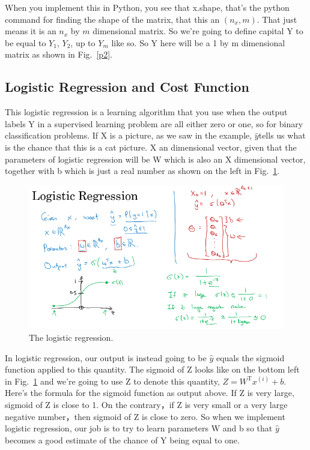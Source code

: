 \documentclass[a4paper]{article}
\begin{document}
When you implement this in Python, you see that x.shape, that's the python command for finding the shape of the matrix, that this an $(n_x, m)$. That just means it is an $n_x$ by $m$ dimensional matrix. So we're going to define capital Y to be equal to $Y_1$, $Y_2$, up to $Y_m$ like so. So Y here will be a 1 by m dimensional matrix as shown in Fig.~\ref{p2}.

\subsection{Logistic Regression and Cost Function}

This logistic regression is a learning algorithm that you use when the output labels Y in a supervised learning problem are all either zero or one, so for binary classification problems. If X is a picture, as we saw in the example, $\hat{y}$tells us what is the chance that this is a cat picture. X an dimensional vector, given that the parameters of logistic regression will be W which is also an X dimensional vector, together with b which is just a real number as shown on the left in Fig.~\ref{p3}.
\begin{figure}
	\begin{center}
		\includegraphics[scale=0.4]{figures/4.png}
	\end{center}
	\caption{The logistic regression.}
	\label{p3}
\end{figure}

In logistic regression, our output is instead going to be $\hat{y}$ equals the sigmoid function applied to this quantity. The sigmoid of Z looks like on the bottom left in Fig.~\ref{p3} and we're going to use Z to denote this quantity, $Z=W^\mathrm{T}x^{(i)}+b$. Here's the formula for the sigmoid function as output above. If Z is very large, sigmoid of Z is close to 1. On the contrary，if Z is very small or a very large negative number，then sigmoid of Z is close to zero. So when we implement logistic regression, our job is to try to learn parameters W and b so that $\hat{y}$ becomes a good estimate of the chance of Y being equal to one.
\end{document}
